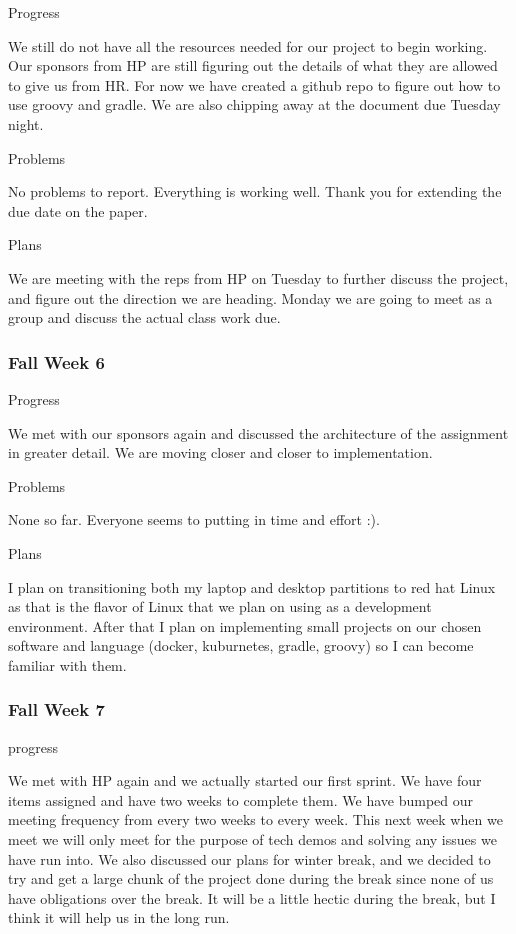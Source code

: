 \documentclass[onecolumn, draftclsnofoot,10pt, compsoc]{IEEEtran}
\begin{document}
Progress

We still do not have all the resources needed for our project to begin working. Our sponsors from HP are still figuring out the details of what they are allowed to give us from HR. For now we have created a github repo to figure out how to use groovy and gradle. We are also chipping away at the document due Tuesday night.

Problems

No problems to report. Everything is working well. Thank you for extending the due date on the paper.

Plans

We are meeting with the reps from HP on Tuesday to further discuss the project, and figure out the direction we are heading. Monday we are going to meet as a group and discuss the actual class work due.

\subsubsection*{Fall Week 6}

Progress

We met with our sponsors again and discussed the architecture of the assignment in greater detail. We are moving closer and closer to implementation.

Problems

None so far. Everyone seems to putting in time and effort :).

Plans

I plan on transitioning both my laptop and desktop partitions to red hat Linux as that is the flavor of Linux that we plan on using as a development environment. After that I plan on implementing small projects on our chosen software and language (docker, kuburnetes, gradle, groovy) so I can become familiar with them.

\subsubsection*{Fall Week 7}

progress

We met with HP again and we actually started our first sprint. We have four items assigned and have two weeks to complete them. We have bumped our meeting frequency from every two weeks to every week. This next week when we meet we will only meet for the purpose of tech demos and solving any issues we have run into. We also discussed our plans for winter break, and we decided to try and get a large chunk of the project done during the break since none of us have obligations over the break. It will be a little hectic during the break, but I think it will help us in the long run.
\end{document}

